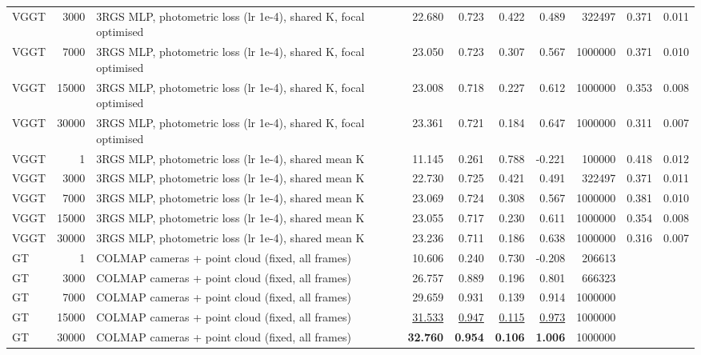 \begin{table}[H]
\begin{tabular}{lrlrrrrrrr}
VGGT & 3000 & 3RGS MLP, photometric loss (lr 1e-4), shared K, focal optimised & 22.680 & 0.723 & 0.422 & 0.489 & 322497 & 0.371 & 0.011 \\
VGGT & 7000 & 3RGS MLP, photometric loss (lr 1e-4), shared K, focal optimised & 23.050 & 0.723 & 0.307 & 0.567 & 1000000 & 0.371 & 0.010 \\
VGGT & 15000 & 3RGS MLP, photometric loss (lr 1e-4), shared K, focal optimised & 23.008 & 0.718 & 0.227 & 0.612 & 1000000 & 0.353 & 0.008 \\
VGGT & 30000 & 3RGS MLP, photometric loss (lr 1e-4), shared K, focal optimised & 23.361 & 0.721 & 0.184 & 0.647 & 1000000 & 0.311 & 0.007 \\
VGGT & 1 & 3RGS MLP, photometric loss (lr 1e-4), shared mean K & 11.145 & 0.261 & 0.788 & -0.221 & 100000 & 0.418 & 0.012 \\
VGGT & 3000 & 3RGS MLP, photometric loss (lr 1e-4), shared mean K & 22.730 & 0.725 & 0.421 & 0.491 & 322497 & 0.371 & 0.011 \\
VGGT & 7000 & 3RGS MLP, photometric loss (lr 1e-4), shared mean K & 23.069 & 0.724 & 0.308 & 0.567 & 1000000 & 0.381 & 0.010 \\
VGGT & 15000 & 3RGS MLP, photometric loss (lr 1e-4), shared mean K & 23.055 & 0.717 & 0.230 & 0.611 & 1000000 & 0.354 & 0.008 \\
VGGT & 30000 & 3RGS MLP, photometric loss (lr 1e-4), shared mean K & 23.236 & 0.711 & 0.186 & 0.638 & 1000000 & 0.316 & 0.007 \\
GT & 1 & COLMAP cameras + point cloud (fixed, all frames) & 10.606 & 0.240 & 0.730 & -0.208 & 206613 &  &  \\
GT & 3000 & COLMAP cameras + point cloud (fixed, all frames) & 26.757 & 0.889 & 0.196 & 0.801 & 666323 &  &  \\
GT & 7000 & COLMAP cameras + point cloud (fixed, all frames) & 29.659 & 0.931 & 0.139 & 0.914 & 1000000 &  &  \\
GT & 15000 & COLMAP cameras + point cloud (fixed, all frames) & \underline{31.533} & \underline{0.947} & \underline{0.115} & \underline{0.973} & 1000000 &  &  \\
GT & 30000 & COLMAP cameras + point cloud (fixed, all frames) & \textbf{32.760} & \textbf{0.954} & \textbf{0.106} & \textbf{1.006} & 1000000 &  &  \\
\bottomrule
\end{tabular}
\end{table}